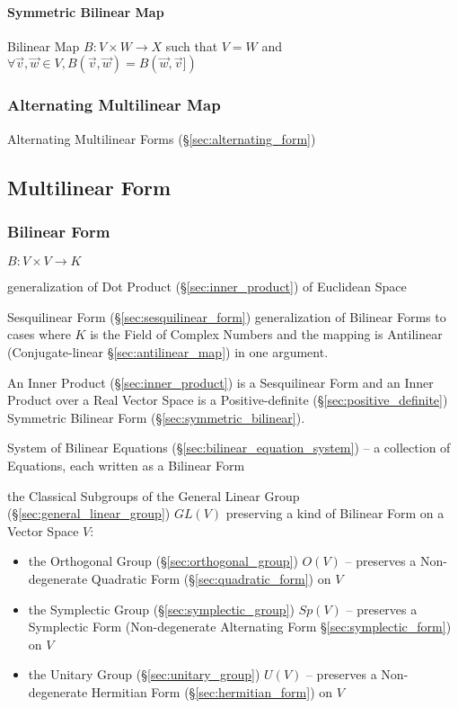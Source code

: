 \paragraph{Symmetric Bilinear Map}\label{sec:symmetric_bilinear_map}\hfill

Bilinear Map $B : V \times W \rightarrow X$ such that $V = W$ and
$\forall \vec{v},\vec{w} \in V, B(\vec{v},\vec{w}) = B(\vec{w},\vec{v}])$



\subsubsection{Alternating Multilinear Map}\label{sec:alternating_map}

Alternating Multilinear Forms (\S\ref{sec:alternating_form})



\subsection{Multilinear Form}\label{sec:multilinear_form}

\subsubsection{Bilinear Form}\label{sec:bilinear_form}

$B : V \times V \rightarrow K$

generalization of Dot Product (\S\ref{sec:inner_product}) of Euclidean Space

Sesquilinear Form (\S\ref{sec:sesquilinear_form}) generalization of Bilinear
Forms to cases where $K$ is the Field of Complex Numbers and the mapping is
Antilinear (Conjugate-linear \S\ref{sec:antilinear_map}) in one argument.

An Inner Product (\S\ref{sec:inner_product}) is a Sesquilinear Form and an
Inner Product over a Real Vector Space is a Positive-definite
(\S\ref{sec:positive_definite}) Symmetric Bilinear Form
(\S\ref{sec:symmetric_bilinear}).

\fist System of Bilinear Equations (\S\ref{sec:bilinear_equation_system}) -- a
collection of Equations, each written as a Bilinear Form

the Classical Subgroups of the General Linear Group
(\S\ref{sec:general_linear_group}) $GL(V)$ preserving a kind of Bilinear Form
on a Vector Space $V$:
\begin{itemize}
  \item the Orthogonal Group (\S\ref{sec:orthogonal_group}) $O(V)$ -- preserves
    a Non-degenerate Quadratic Form (\S\ref{sec:quadratic_form}) on $V$
  \item the Symplectic Group (\S\ref{sec:symplectic_group}) $Sp(V)$
    -- preserves a Symplectic Form (Non-degenerate Alternating Form
    \S\ref{sec:symplectic_form}) on $V$
  \item the Unitary Group (\S\ref{sec:unitary_group}) $U(V)$
    -- preserves a Non-degenerate Hermitian Form (\S\ref{sec:hermitian_form})
    on $V$
\end{itemize}

